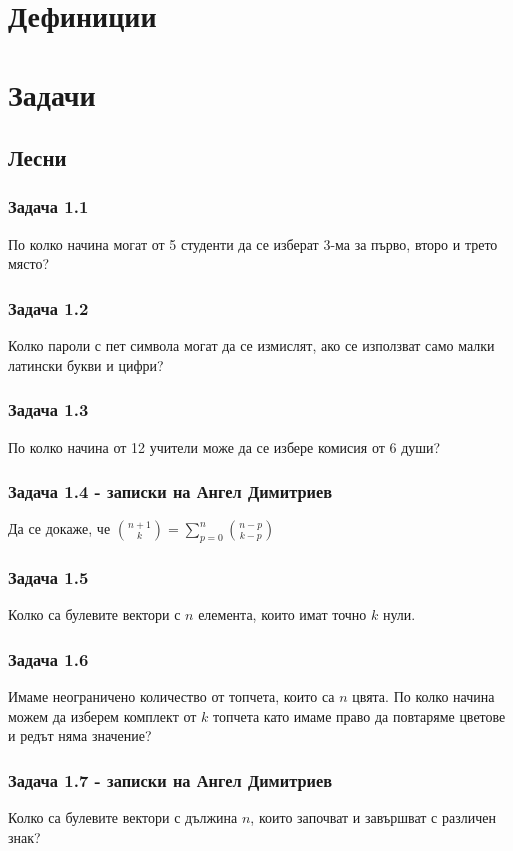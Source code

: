 \documentclass[12pt]{article}
\begin{document}
\section*{Дефиниции}

\section*{Задачи}

\subsection*{Лесни}
\subsubsection*{Задача 1.1}
По колко начина могат от 5 студенти да се изберат 3-ма за първо, второ и трето място? 
\subsubsection*{Задача 1.2}
Колко пароли с пет символа могат да се измислят, ако се използват само малки латински букви и цифри?
\subsubsection*{Задача 1.3}
По колко начина от 12 учители може да се избере комисия от 6 души?
\subsubsection*{Задача 1.4 - записки на Ангел Димитриев}
Да се докаже, че $\binom{n+1}{k} = \displaystyle\sum_{p=0}^{n} \binom{n-p}{k-p}$
\subsubsection*{Задача 1.5}
Колко са булевите вектори с $n$ елемента, които имат точно $k$ нули.
\subsubsection*{Задача 1.6}
Имаме неограничено количество от топчета, които са $n$ цвята. По колко начина можем да изберем комплект от $k$ топчета като имаме право да повтаряме цветове и редът няма значение?
\subsubsection*{Задача 1.7 - записки на Ангел Димитриев}
Колко са булевите вектори с дължина $n$, които започват и завършват с различен знак?
\end{document}
